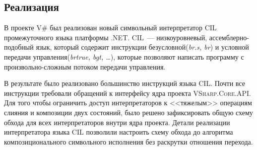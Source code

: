 \subsection{Реализация}
В проекте V\# был реализован новый символьный интерпретатор CIL промежуточного языка платформы .NET.
CIL~--- низкоуровневый, ассемблерно-подобный язык, который содержит инструкции безусловной(\emph{br.s, br}) и условной передачи управления(\emph{brtrue, bgt, \dots}), которые позволяют написать программу с произвольно-сложным потоком передачи управления.

В результате было реализовано большинство инструкций языка CIL. Почти все инструкции требовали обращений к интерфейсу ядра проекта \textsc{VSharp.Core.API}. Для того чтобы ограничить доступ интерпретаторов к <<тяжелым>> операциям слияния и композиции двух состояний, было решено зафиксировать общую схему обхода для всех интерпретаторов внутри ядра проекта. Детали реализации интерпретатора языка CIL позволили настроить схему обхода до алгоритма композиционального символьного исполнения без раскрутки отношения перехода.

